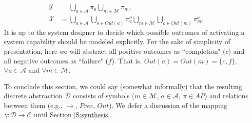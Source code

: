 \begin{subequations}
	\label{ActOutAP}
	\begin{align}
		\mathcal{Y} &= \bigcup \limits_{a \in \mathcal{A}} \pi_a \bigcup \limits_{m \in \mathcal{M}} \pi_m,\\
		\mathcal{X} &= 
		\bigcup \limits_{a \in \mathcal{A}} \bigcup \limits_{o \in Out(a)} \pi_a^o \bigcup \limits_{m \in \mathcal{M}} \bigcup \limits_{o \in Out(m)} \pi_m^o,
	\end{align}
\end{subequations}
It is up to the system designer to decide which possible outcomes of activating a system capability should be modeled explicitly.
For the sake of simplicity of presentation, here we will abstract all positive outcomes as ``completion" ($c$) and all negative outcomes as ``failure" ($f$). 
That is, $Out(a) = Out(m) = \{ c, f \}$, $\forall a \in \mathcal{A}$ and $\forall m \in \mathcal{M}$.

To conclude this section, we could say (somewhat informally) that the resulting discrete abstraction $\mathcal{D}$ consists of symbols ($m \in \mathcal{M}$, $a \in \mathcal{A}$, $\pi \in AP$) and relations between them (e.g., $\boldsymbol\rightarrow$, $Prec$, $Out$).
We defer a discussion of the mapping $\gamma: \mathcal{D} \rightarrow \mathcal{C}$ until Section \ref{S:synthesis}.

%

